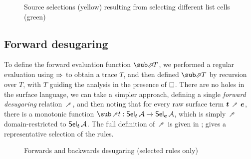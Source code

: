 \begin{figure}
   \begin{subfigure}{0.48\textwidth}
      \small
      
   \end{subfigure}
   \hfill
   \begin{subfigure}{0.48\textwidth}
      \small
      
   \end{subfigure}
   \vspace{-3mm}
   \caption{Source selections (yellow) resulting from selecting different list cells (green)}
   \vspace{-2mm}
\label{fig:surface-language:example-1}
\end{figure}

\subsection{Forward desugaring}

To define the forward evaluation function $\evalFwdF{T}$, we performed a regular evaluation using $\Rightarrow$ to obtain a trace $T$, and then defined $\evalFwdF{T}$ by recursion over $T$, with $T$ guiding the analysis in the presence of $\square$. There are no holes in the surface language, we can take a simpler approach, defining a single \emph{forward desugaring} relation $\desugarFwdR$, and then noting that for every raw surface term $\raw{t} \desugarFwdR \raw{e}$, there is a monotonic function $\desugarFwdF{t}: \Sel{\raw{t}}{A} \to \Sel{\raw{e}}{A}$, which is simply $\desugarFwdR$ domain-restricted to $\textup{\textsf{Sel}}_{\bm{t}}\,{\mathcal{A}}$. The full definition of $\desugarFwdR$ is \ifappendices given in  \else \IncludedWithSupplementaryMaterial \fi;  gives a representative selection of the rules.

\begin{figure}
   
   \caption{Forwards and backwards desugaring (selected rules only)}
   \label{fig:surface-language:desugar}
\end{figure}

